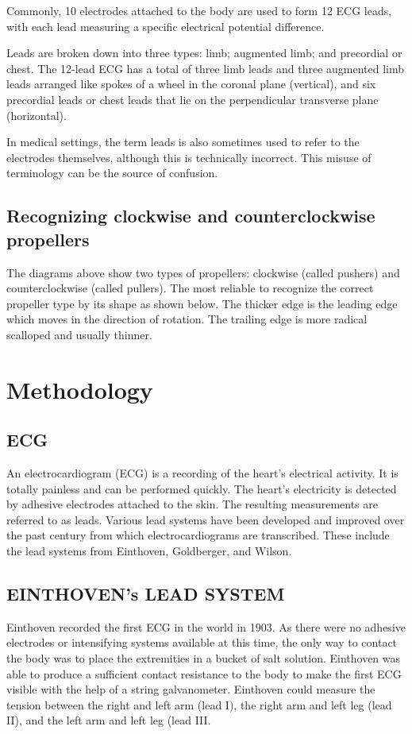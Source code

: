 \documentclass[12pt,a4paper]{report}
\begin{document}
Commonly, 10 electrodes attached to the body are used to form 12 ECG leads, with each lead measuring a specific electrical potential difference.

Leads are broken down into three types: limb; augmented limb; and precordial or chest. The 12-lead ECG has a total of three limb leads and three augmented limb leads arranged like spokes of a wheel in the coronal plane (vertical), and six precordial leads or chest leads that lie on the perpendicular transverse plane (horizontal).

In medical settings, the term leads is also sometimes used to refer to the electrodes themselves, although this is technically incorrect. This misuse of terminology can be the source of confusion.



\subsection {Recognizing clockwise and counterclockwise propellers}
\hspace*{1cm} The diagrams above show two types of propellers: clockwise (called pushers) and counterclockwise (called pullers). The most reliable to recognize the correct propeller type by its shape as shown below. The thicker edge is the leading edge which moves in the direction of rotation. The trailing edge is more radical scalloped and usually thinner. 


\newpage

\section{Methodology}
\subsection{ECG}


\hspace*{1cm}  An electrocardiogram (ECG) is a recording of the heart’s electrical activity. It is totally painless and can be performed quickly. The heart’s electricity is detected by adhesive electrodes attached to the skin. The resulting measurements are referred to as leads. Various lead systems have been developed and improved over the past century from which electrocardiograms are transcribed. These include the lead systems from Einthoven, Goldberger, and Wilson.

 \subsection{EINTHOVEN's LEAD SYSTEM}
\hspace*{1cm} Einthoven recorded the first ECG in the world in 1903. As there were no adhesive electrodes or intensifying systems available at this time, the only way to contact the body was to place the extremities in a bucket of salt solution. Einthoven was able to produce a sufficient contact resistance to the body to make the first ECG visible with the help of a string galvanometer. Einthoven could measure the tension between the right and left arm (lead I), the right arm and left leg (lead II), and the left arm and left leg (lead III. \\\
\end{document}
